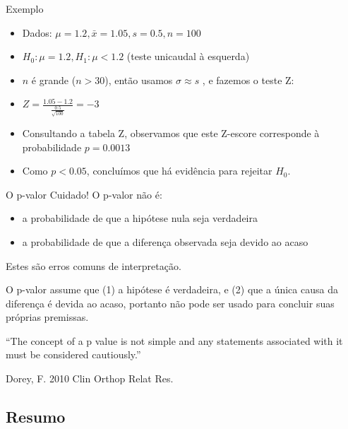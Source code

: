 \documentclass{beamer}
\begin{document}
\begin{frame}{Exemplo}
  \begin{example}
    \begin{itemize}
    \item Dados: $\mu = 1.2, \bar{x} = 1.05, s = 0.5, n=100$
    \item $H_0: \mu = 1.2, H_1: \mu < 1.2$ (teste unicaudal à esquerda)
    \item $n$ é grande ($n > 30$), então usamos $\sigma \approx s$ , e
      fazemos o teste Z:
    \item $Z = \frac{1.05 - 1.2}{\frac{0.5}{\sqrt{100}}} = -3$
    \item Consultando a tabela Z, observamos que este Z-escore
      corresponde à probabilidade $p=0.0013$
    \item Como $p < 0.05$, concluímos que há evidência para rejeitar
      $H_0$.
    \end{itemize}
  \end{example}
\end{frame}

\begin{frame}{O p-valor}
  Cuidado! O p-valor \alert{não é}:
  \begin{itemize}
  \item a probabilidade de que a hipótese nula seja verdadeira
  \item a probabilidade de que a diferença observada seja devido ao
    acaso
  \end{itemize}
  \begin{block}{}
    Estes são erros comuns de interpretação. 

    O p-valor assume que (1) a hipótese é verdadeira, e (2) que a
    única causa da diferença é devida ao acaso, portanto não pode ser
    usado para concluir suas próprias premissas.
  \end{block}
  \begin{block}{}
    ``The concept of a p value is not simple and any statements
    associated with it must be considered cautiously.''

    Dorey, F. 2010 Clin Orthop Relat Res.
  \end{block}
\end{frame}

\subsection{Resumo}
\end{document}
